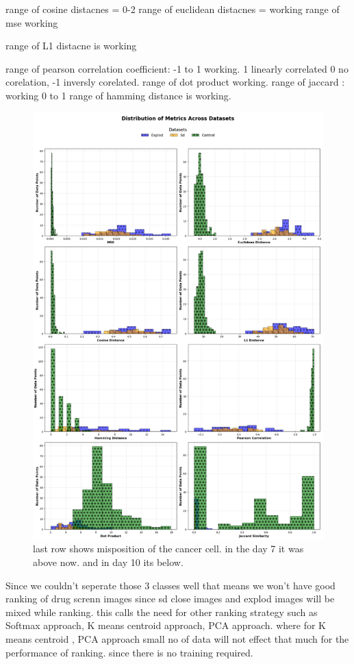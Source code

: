 range of cosine distacnes = 0-2
range of euclidean distacnes = working
range of mse working

range of L1 distacne is working

range of pearson correlation coefficient: -1 to 1 working. 1 linearly correlated 0 no corelation, -1 inversly corelated.
range of dot product  working.
range of jaccard : working 0 to 1
range of hamming distance is working.


\begin{figure}[H]
  \centering
  \includegraphics[scale=0.7]{figures/bargraph.pdf} 
  \caption{last row shows misposition of the cancer cell. in the day 7 it was above now. and in day 10 its below.}
  \label{fig:bargraph}
\end{figure}

Since we couldn't seperate those 3 classes well that means we won't have good ranking of drug screnn images since sd close images and explod images will be mixed while ranking. this calls the need for other ranking strategy such as Softmax approach, K means centroid approach, PCA approach. where for K means centroid , PCA approach small no of data will not effect that much for the performance of ranking. since there is no training required.

